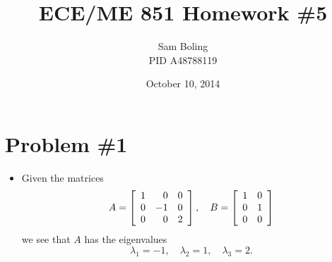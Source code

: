 \documentclass{article}
\title{ECE/ME 851 Homework \#5}
\date{October 10, 2014}
\author{Sam Boling \\ PID A48788119}
\begin{document}
\maketitle

\section*{Problem \#1}
\begin{itemize}
  \item{
    Given the matrices
    $$
    A = \left[\begin{array}{r r r}
          1 &  0 & 0 \\
          0 & -1 & 0 \\
          0 &  0 & 2
        \end{array}\right], \quad
    B = \left[\begin{array}{c c}
          1 & 0 \\
          0 & 1 \\
          0 & 0
        \end{array}\right]
    $$
    we see that $A$ has the eigenvalues
    $$
    \lambda_1 = -1, \quad
    \lambda_2 =  1, \quad
    \lambda_3 =  2.
    $$

}
\end{itemize}
\end{document}
